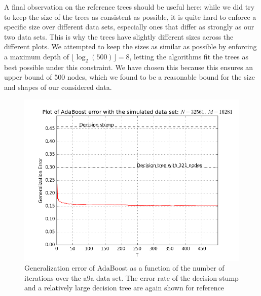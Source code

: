 \par A final observation on the reference trees should be useful here: while we did try to keep the size of the trees as consistent as possible, it is quite hard to enforce a specific size over different data sets, especially ones that differ as strongly as our two data sets. This is why the  trees have slightly different sizes across the different plots. We attempted to keep the sizes as similar as possible by enforcing a maximum depth of $\lfloor \log_2(500)\rfloor=8$, letting the algorithms fit the trees as best possible under this constraint. We have chosen this because this ensures an upper bound of 500 nodes, which we found to be a reasonable bound for the size and shapes of our considered data.
\begin{figure}[!ht]
  \centering
      \includegraphics[width=\graphWidth]{generated/ADSVM.png}
  \caption{Generalization error of AdaBoost as a function of the number of iterations over the a9a data set. The error rate of the decision stump and a relatively large decision tree are again shown for reference}
      \label{fig:adaBSVM}
\end{figure}
\FloatBarrier

